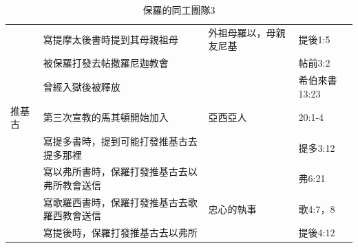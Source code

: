 \begin{table}[htbp]
\begin{tabular}{|l|l|l|l|}
       & 寫提摩太後書時提到其母親祖母  &外祖母羅以，母親友尼基& 提後1:5 \\        
       &被保羅打發去帖撒羅尼迦教會 && 帖前3:2 \\        
      &曾經入獄後被釋放 && 希伯來書13:23 \\        
    \midrule    
   推基古   &第三次宣教的馬其頓開始加入  &亞西亞人& 20:1-4\\
    & 寫提多書時，提到可能打發推基古去提多那裡  & &提多3:12\\
    & 寫以弗所書時，保羅打發推基古去以弗所教會送信  & &弗6:21\\ 
  & 寫歌羅西書時，保羅打發推基古去歌羅西教會送信  &  忠心的執事&歌4:7，8\\ 
   & 寫提後時，保羅打發推基古去以弗所  &  &提後4:12\\   
 
    \bottomrule
    \end{tabular}%
      \caption{保羅的同工團隊3}
  \label{tab:addlabel}%
\end{table}%


